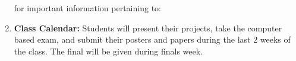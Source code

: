 \documentclass{article}
\begin{document}
\begin{enumerate}
for important information pertaining to:



\item \textbf{Class Calendar:} Students will present their projects, take the computer based exam, and submit their posters and papers during the last 2 weeks of the class. The final will be given during finals week.
\end{enumerate}
\end{document}
